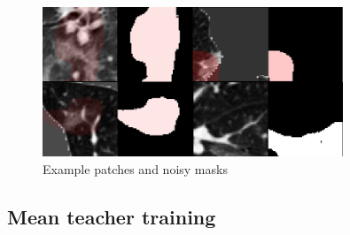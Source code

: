 \begin{figure}[h]
	\centering
	\includegraphics[width=0.8\textwidth]{img/semi-experiment/fake_assign_example}
	\caption{Example patches and noisy masks}
	\label{fig:patches_noisy_mask}
\end{figure}
\subsection{Mean teacher training}



